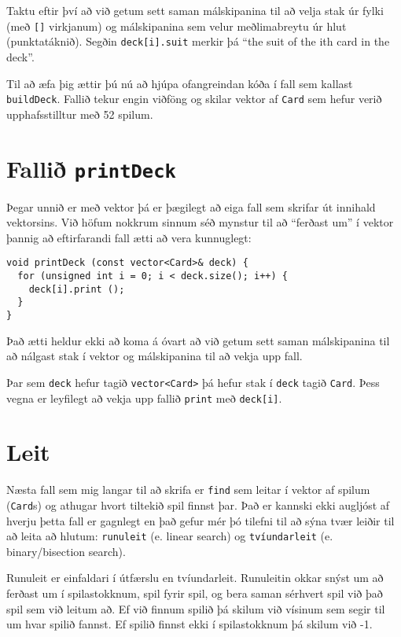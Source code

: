
Taktu eftir því að við getum sett saman málskipanina til að velja stak úr fylki (með {\tt []} virkjanum)
og málskipanina sem velur meðlimabreytu úr hlut (punktatáknið).
Segðin {\tt deck[i].suit} merkir þá ``the suit of the ith card in the deck''.


Til að æfa þig ættir þú nú að hjúpa ofangreindan kóða í fall sem kallast {\tt buildDeck}.
Fallið tekur engin viðföng og skilar vektor af {\tt Card} sem hefur verið upphafsstilltur með 52 spilum.

\section{Fallið {\tt printDeck}}
\label{printdeck}

Þegar unnið er með vektor þá er þægilegt að eiga fall sem skrifar út innihald vektorsins.
Við höfum nokkrum sinnum séð mynstur til að ``ferðast um'' í vektor þannig að eftirfarandi fall ætti að vera kunnuglegt:

\begin{verbatim}
void printDeck (const vector<Card>& deck) {
  for (unsigned int i = 0; i < deck.size(); i++) {
    deck[i].print ();
  }
}
\end{verbatim}
%
Það ætti heldur ekki að koma á óvart að við getum sett saman málskipanina til að nálgast stak í vektor og málskipanina til að vekja upp fall.

Þar sem {\tt deck} hefur tagið {\tt vector<Card>} þá hefur stak í {\tt deck} tagið {\tt Card}.
Þess vegna er leyfilegt að vekja upp fallið {\tt print} með {\tt deck[i]}.

\section{Leit}
\label{find}

Næsta fall sem mig langar til að skrifa er {\tt find} sem leitar í vektor af spilum ({\tt Card}s)
og athugar hvort tiltekið spil finnst þar.
Það er kannski ekki augljóst af hverju þetta fall er gagnlegt en það gefur mér þó tilefni til að sýna
tvær leiðir til að leita að hlutum: {\tt runuleit} (e. linear search) og {\tt tvíundarleit} (e. binary/bisection search).


Runuleit er einfaldari í útfærslu en tvíundarleit.
Runuleitin okkar snýst um að ferðast um í spilastokknum, spil fyrir spil, og bera saman sérhvert spil við það spil sem við leitum að.
Ef við finnum spilið þá skilum við vísinum sem segir til um hvar spilið fannst.
Ef spilið finnst ekki í spilastokknum þá skilum við -1.

